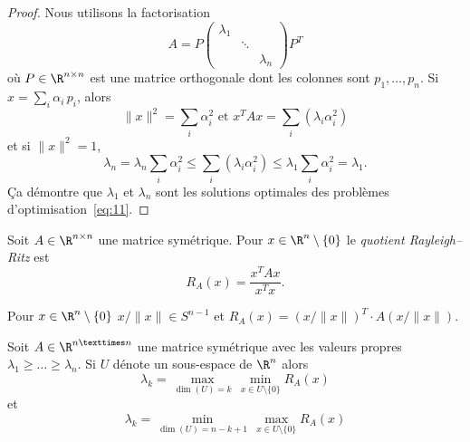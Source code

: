 \begin{proof}
  Nous utilisons la factorisation 
  \begin{displaymath}
    A = P
    \begin{pmatrix}
      \lambda_1 \\
      & \ddots \\
      && \lambda_n
    \end{pmatrix} P^T
  \end{displaymath}
où $P \in \R^{n\times n}$ est une matrice orthogonale dont les colonnes sont $p_1,\dots,p_n$. Si $x = \sum_i \alpha_i \,p_i$,   alors 
\begin{displaymath}
\|x\|^2 = \sum_i \alpha_i^2   \text{ et } x^T A x =  \sum_i (\lambda_i \alpha_i^2)
\end{displaymath}
et si $\|x\|^2 = 1$, 
\begin{displaymath}
\lambda_n =  \lambda_n  \sum_i  \alpha_i^2  \leq  \sum_i (\lambda_i \alpha_i^2) \leq \lambda_1  \sum_i  \alpha_i^2 = \lambda_1. 
\end{displaymath}
Ça démontre que $\lambda_1$ et $\lambda_n$ sont les solutions optimales des problèmes d'optimisation~\eqref{eq:11}. 

\end{proof}



\begin{definition}
  \label{def:23}
  Soit $A \in \R^{n \times n}$ une matrice symétrique. Pour $x \in \R^n\setminus \{0\}$ le  \emph{quotient Rayleigh–Ritz } est 
\begin{displaymath}
  R_A(x) = \frac{x^TAx}{x^Tx}. 
\end{displaymath}
\end{definition}
Pour $x \in \R^n \setminus \{0\}$ $ x / \|x\| \in S^{n-1}$ et $R_A(x) = (x / \|x\| )^T \cdot A  (x / \|x\|)$. 

\begin{theorem}
\label{thr:19}
Soit $A \in \R^{n × n}$ une matrice symétrique avec les valeurs propres 
$\lambda_1 \geq \dots \geq \lambda_n$.   Si $U$ dénote un sous-espace de $\R^n$ alors 
\begin{equation}
  \label{eq:12} 
  \lambda_k = \max_{ \dim(U) = k } \, \min_{x \in U \setminus \{0\}}  R_A(x)  
\end{equation}
et
\begin{equation}
  \label{eq:13}
  \lambda_k = \min_{ \dim(U) = n-k+1 } \, \max_{x \in U \setminus \{0\}}  R_A(x)  
\end{equation}
\end{theorem}

